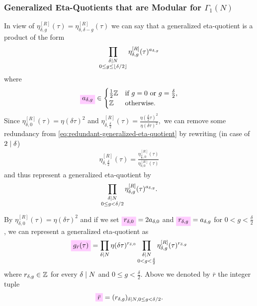 \documentclass{article}
\begin{document}
\subsubsection{Generalized Eta-Quotients that are Modular for $\Gamma_1(N)$}

In view of $\eta_{\delta,g}^{[R]}(\tau) = \eta_{\delta,\delta-g}^{[R]}(\tau)$ we
can say that a generalized eta-quotient is a product of the form
\begin{gather}
  \prod_{\substack{\delta \mid N\\ 0\le g \le \lfloor\delta/2\rfloor}}
       \eta_{\delta,g}^{[R]}(\tau)^{a_{\delta,g}}
\end{gather}
where
\begin{gather}
  \defineNotation[a-delta-g]{a_{\delta,g}}\in
  \begin{cases}
    \frac{1}{2}\setZ & \text{if $g=0$ or $g=\frac{\delta}{2}$},\\
    \setZ & \text{otherwise}.
  \end{cases}
\end{gather}
Since $\eta_{\delta,0}^{[R]}(\tau) = \eta(\delta\tau)^2$ and
$\eta_{\delta,\frac{\delta}{2}}^{[R]}(\tau)
=
\frac{\eta(\frac{\delta}{2}\tau)^2}{\eta(\delta\tau)^2},
$
we can remove some redundancy from
\eqref{eq:redundant-generalized-eta-quotient} by rewriting (in case of
$2 \mid \delta$)
\begin{gather}
  \eta_{\delta,\frac{\delta}{2}}^{[R]}(\tau)
  =
  \frac{\eta_{\frac{\delta}{2}, 0}^{[R]}(\tau)}{\eta_{\delta,0}^{[R]}(\tau)}
\end{gather}
and thus represent a generalized eta-quotient by
\begin{gather}
  \prod_{\substack{\delta \mid N\\0\le g < \delta/2}}
       \eta_{\delta,g}^{[R]}(\tau)^{a_{\delta,g}}.
  \label{eq:redundant-generalized-eta-quotient}
\end{gather}

By $\eta_{\delta,0}^{[R]}(\tau) = \eta(\delta\tau)^2$ and if we set
$\defineNotation[r-delta-0]{r_{\delta,0}} = 2 a_{\delta,0}$ and
$\defineNotation[r-delta-g]{r_{\delta,g}}=a_{\delta,g}$ for
$0<g<\frac{\delta}{2}$, we can represent a generalized eta-quotient as
\begin{gather}
  \defineNotation[g-rbar-tau]{g_{\bar{r}}(\tau)} =
  \prod_{\delta|N} \eta(\delta\tau)^{r_{\delta,0}}
  \prod_{\substack{\divides{\delta}{N}\\0 < g < \frac{\delta}{2}}}
  \eta_{\delta,g}^{[R]}(\tau)^{r_{\delta,g}}
  \label{eq:g_rbar(tau)}
\end{gather}
where $ r_{\delta,g} \in\mathbb{Z}$ for every
$\delta \mid N$ and $0 \le g< \frac{\delta}{2}$.
Above we denoted by $\bar{r}$ the integer tuple
\begin{gather*}
  \defineNotation[rbar]{\bar{r}}
  =
  (r_{\delta,g})_{\divides{\delta}{N}, 0\le g < \delta/2}.
\end{gather*}
\end{document}
